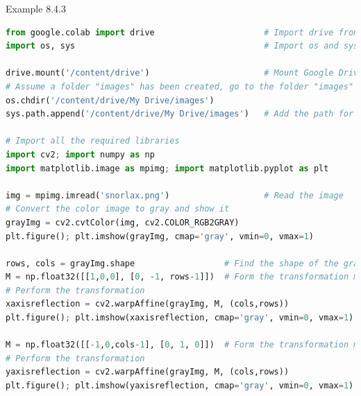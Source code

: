\documentclass{book}
\begin{document}
\begin{egBox}{Example 8.4.3}{}
    \raggedright
    \begin{lstlisting}[language=Python, basicstyle=\ttfamily\small, keywordstyle=\color{blue}, commentstyle=\color{forestgreen}, stringstyle=\color{red}, showstringspaces=false]
from google.colab import drive                      # Import drive from google.colab package
import os, sys                                      # Import os and sys modules

drive.mount('/content/drive')                       # Mount Google Drive
# Assume a folder "images" has been created, go to the folder "images"
os.chdir('/content/drive/My Drive/images')
sys.path.append('/content/drive/My Drive/images')   # Add the path for interpreter to search

# Import all the required libraries
import cv2; import numpy as np
import matplotlib.image as mpimg; import matplotlib.pyplot as plt

img = mpimg.imread('snorlax.png')                   # Read the image
# Convert the color image to gray and show it
grayImg = cv2.cvtColor(img, cv2.COLOR_RGB2GRAY)
plt.figure(); plt.imshow(grayImg, cmap='gray', vmin=0, vmax=1)

rows, cols = grayImg.shape                  # Find the shape of the gray image
M = np.float32([[1,0,0], [0, -1, rows-1]])  # Form the transformation matrix of x-axis reflection
# Perform the transformation
xaxisreflection = cv2.warpAffine(grayImg, M, (cols,rows))
plt.figure(); plt.imshow(xaxisreflection, cmap='gray', vmin=0, vmax=1)

M = np.float32([[-1,0,cols-1], [0, 1, 0]])  # Form the transformation matrix of y-axis reflection
# Perform the transformation
yaxisreflection = cv2.warpAffine(grayImg, M, (cols,rows))
plt.figure(); plt.imshow(yaxisreflection, cmap='gray', vmin=0, vmax=1)


\end{lstlisting}
\end{egBox}
\end{document}
